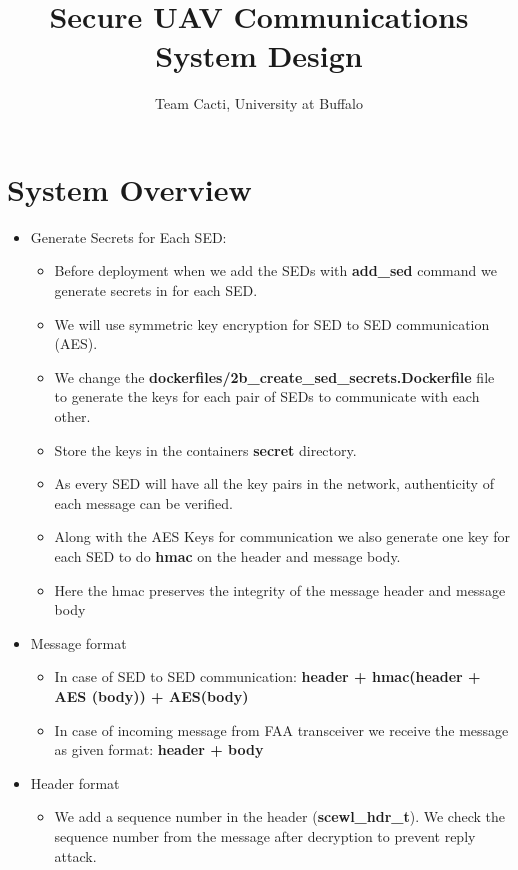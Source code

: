 \documentclass[11pt,oneside,onecolumn,letterpaper]{article}
\title{Secure UAV Communications System Design}
\author{Team Cacti, University at Buffalo}
\date{}
\begin{document}
\normalsize


\maketitle

\renewcommand{\thepage}{System Design, Cacti, UB--\arabic{page}}
\setcounter{page}{1} \normalsize
%

\newcommand{\flagRollback}{\textsf{Rollback}\xspace}

\section{System Overview}
\begin{itemize}
  \item Generate Secrets for Each SED:
  \begin{itemize}
  \item Before deployment when we add the SEDs with \textbf{add\_sed}  
      command we generate secrets in for each SED. 
      \item We will use symmetric key encryption for SED to SED communication (AES).
      \item We change the  \textbf{dockerfiles/2b\_create\_sed\_secrets.Dockerfile} file to generate the keys for each pair of SEDs to communicate with each other.
      \item Store the keys in the containers \textbf{secret} directory.
      \item As every SED will have all the key pairs in the network, authenticity of each message can be verified.
      \item Along with the AES Keys for communication we also generate one key for each SED to do \textbf{hmac} on the header and message body. 
      \item Here the hmac preserves the integrity of the message header and message body
  \end{itemize}
  \item Message format
  \begin{itemize}
  \item In case of SED to SED communication: \textbf{header + hmac(header + AES (body)) + AES(body)}
  \item In case of incoming message from FAA transceiver we receive the message as given format: \textbf{header + body}
  \end{itemize}
  \item Header format
  \begin{itemize}
  \item We add a sequence number in the header (\textbf{scewl\_hdr\_t}). We check the sequence number from the message after decryption to prevent reply attack.
  \end{itemize}

\end{itemize}
\end{document}
